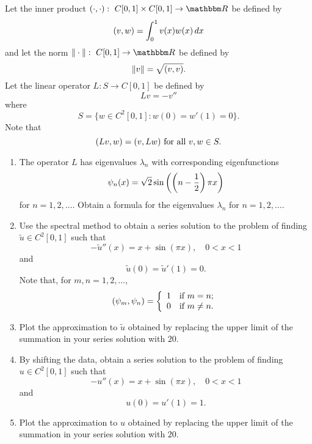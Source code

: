 Let the inner product $\ip{\cdot,\cdot}:\mbox{ }C[0,1]\times C[0,1]\rightarrow\R$ be defined by
\[
(v,w)=\int_0^1v(x)w(x)\,dx
\]
and let the norm $\norm{\cdot}:\mbox{ }C[0,1]\rightarrow\R$ be defined by
\[
\|v\|=\sqrt{(v,v)}.
\]
Let the linear operator $L: S\to C[0,1]$ be defined by
\[
L v = -v''
\]
where
\[
S = \{ w \in C^2[0,1] : w(0) = w'(1) = 0\}.
\]
Note that
\[
(Lv,w)=(v,Lw)\mbox{ for all }v,w\in S.
\]

\begin{enumerate}
\item The operator $L$ has eigenvalues $\lambda_n$ with corresponding eigenfunctions
\[
\psi_n(x) = \sqrt{2} \sin\left(\left(n-{1\over 2}\right)\pi x\right)
\]
for $n=1,2,\ldots$. Obtain a formula for the eigenvalues $\lambda_n$ for $n=1,2,\ldots$.
\\
\item Use the spectral method to obtain a series solution to the problem of finding $\tilde{u}\in C^2[0,1]$ such that
\[
-\tilde{u}''(x) = x + \sin(\pi x),\quad 0<x<1
\]
and
\[
\tilde{u}(0) = \tilde{u}'(1) = 0.
\]
Note that, for $m,n=1,2,\ldots$,
\[
(\psi_m,\psi_n)=\left\{\begin{array}{rl}1&\mbox{if }m=n;\\0&\mbox{if }m\ne n.\end{array}\right.
\]

\item Plot the approximation to $\tilde{u}$ obtained by replacing the upper limit of the summation in your series solution with $20$.
\\
\item By shifting the data, obtain a series solution to the problem of finding $u\in C^2[0,1]$ such that
\[
-u''(x) = x + \sin(\pi x),\quad 0<x<1
\]
and
\[
u(0) = u'(1) = 1.
\]

\item Plot the approximation to $u$ obtained by replacing the upper limit of the summation in your series solution with $20$.
\end{enumerate}




